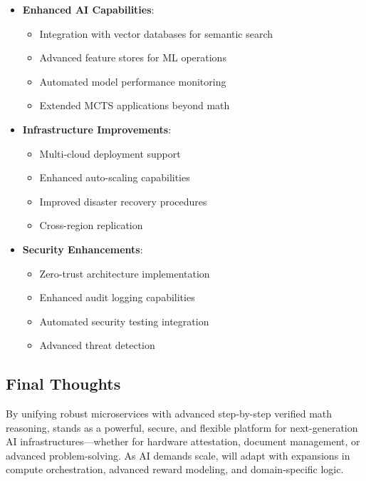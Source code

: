\begin{itemize}
    \item \textbf{Enhanced AI Capabilities}:
    \begin{itemize}
        \item Integration with vector databases for semantic search
        \item Advanced feature stores for ML operations
        \item Automated model performance monitoring
        \item Extended MCTS applications beyond math
    \end{itemize}

    \item \textbf{Infrastructure Improvements}:
    \begin{itemize}
        \item Multi-cloud deployment support
        \item Enhanced auto-scaling capabilities
        \item Improved disaster recovery procedures
        \item Cross-region replication
    \end{itemize}

    \item \textbf{Security Enhancements}:
    \begin{itemize}
        \item Zero-trust architecture implementation
        \item Enhanced audit logging capabilities
        \item Automated security testing integration
        \item Advanced threat detection
    \end{itemize}
\end{itemize}

\subsection{Final Thoughts}

By unifying robust microservices with advanced step-by-step verified math reasoning, \sysname{} stands as a powerful, secure, and flexible platform for next-generation AI infrastructures—whether for hardware attestation, document management, or advanced problem-solving. As AI demands scale, \sysname{} will adapt with expansions in compute orchestration, advanced reward modeling, and domain-specific logic.

